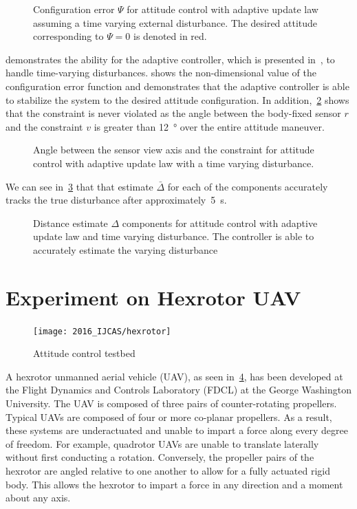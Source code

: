 \begin{figure}[htbp]
    \centering
    
    \caption{Configuration error \( \Psi \) for attitude control with adaptive update law assuming a time varying external disturbance.
    The desired attitude corresponding to \( \Psi = 0 \) is denoted in red.\label{fig:Psi_tv}}
\end{figure}
 demonstrates the ability for the adaptive controller, which is presented in~, to handle time-varying disturbances.
 shows the non-dimensional value of the configuration error function and demonstrates that the adaptive controller is able to stabilize the system to the desired attitude configuration.
In addition,~\cref{fig:con_angle_tv} shows that the constraint is never violated as the angle between the body-fixed sensor \( r \) and the constraint \( v \) is greater than \SI{12}{\degree} over the entire attitude maneuver.
\begin{figure}[htbp]
    \centering
    
    \caption{Angle between the sensor view axis and the constraint for attitude control with adaptive update law with a time varying disturbance. \label{fig:con_angle_tv}}
\end{figure}
We can see in~\cref{fig:Delta_tv} that that estimate \(\bar \Delta \) for each of the components accurately tracks the true disturbance after approximately~\SI{5}{\second}.
\begin{figure}[htbp]
    \centering
    
    \caption{Distance estimate \( \Delta \) components for attitude control with adaptive update law and time varying disturbance.
    The controller is able to accurately estimate the varying disturbance\label{fig:Delta_tv}}
\end{figure}

\section{Experiment on Hexrotor UAV}\label{sec:experiment}

\begin{figure}[htbp]
    \centering
    \texttt{[image: 2016\_IJCAS/hexrotor]}
    \caption{Attitude control testbed~\label{fig:hexrotor}}
\end{figure}
\vspace{-3mm}
A hexrotor unmanned aerial vehicle (UAV), as seen in~\cref{fig:hexrotor}, has been developed at the Flight Dynamics and Controls Laboratory (FDCL) at the George Washington University.
The UAV is composed of three pairs of counter-rotating propellers. 
Typical UAVs are composed of four or more co-planar propellers.
As a result, these systems are underactuated and unable to impart a force along every degree of freedom.
For example, quadrotor UAVs are unable to translate laterally without first conducting a rotation.
Conversely, the propeller pairs of the hexrotor are angled relative to one another to allow for a fully actuated rigid body.
This allows the hexrotor to impart a force in any direction and a moment about any axis. 

